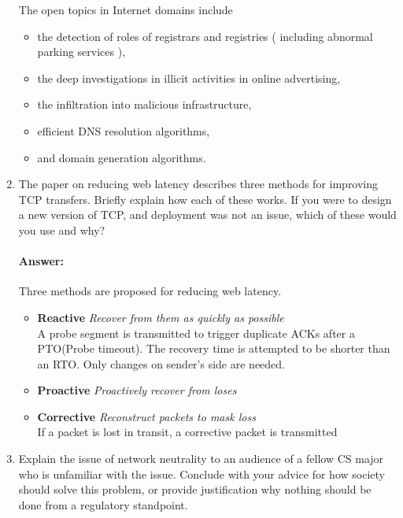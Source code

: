 \documentclass[a4paper,11pt]{article}
\theoremstyle{mytheor}
\begin{document}
\begin{enumerate}
The open topics in Internet domains include
\begin{itemize}
\item the detection of roles of registrars and registries ( including abnormal parking services ),
\item the deep investigations in illicit activities in online advertising,
\item the infiltration into malicious infrastructure,
\item efficient DNS resolution algorithms,
\item and domain generation algorithms.
\end{itemize}
\begin{comment}
\item 
The paper on SSL, HTTPS, and trust models describes a number of flaws with our system for secure communication. 
Choose three of these you feel are most important. 
Describe the aw and explain why this is a critical area where improvement is needed.
\paragraph{Answer:}
xx
\end{comment}

\item
The paper on reducing web latency describes three methods for improving TCP transfers. 
Briefly explain how each of these works. 
If you were to design a new version of TCP, and deployment was not an issue, which of these would you use and why?
\paragraph{Answer:}
Three methods are proposed for reducing web latency.
\begin{itemize}
\item \textbf{Reactive} \emph{Recover from them as quickly as possible} \\
A probe segment is transmitted to trigger duplicate ACKs after a PTO(Probe timeout).
The recovery time is attempted to be shorter than an RTO.
Only changes on sender's side are needed.
\item \textbf{Proactive} \emph{Proactively recover from loses} \\

\item \textbf{Corrective} \emph{Reconstruct packets to mask loss} \\
If a packet is lost in transit, a corrective packet is transmitted
\end{itemize}
\item
Explain the issue of network neutrality to an audience of a fellow CS major who is unfamiliar with the issue.
Conclude with your advice for how society should solve this problem, or provide justification why nothing should be done from a regulatory standpoint.

\end{enumerate}
\end{document}
